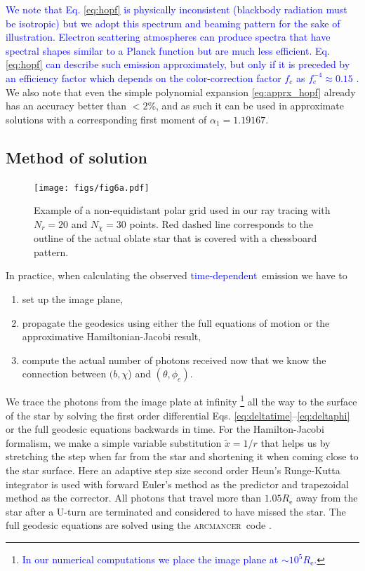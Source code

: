 \documentclass{aa}
\newcommand{\refe}[1]{\textcolor{blue}{{#1}}}
\begin{document}
\refe{We note that Eq. \eqref{eq:hopf} is physically inconsistent (blackbody radiation must be isotropic) but we adopt this spectrum and beaming pattern for the sake of illustration. 
Electron scattering atmospheres can produce spectra that have spectral shapes similar to a Planck function but are much less efficient. 
Eq. \eqref{eq:hopf} can describe such emission approximately, but only if it is preceded by an efficiency factor which depends on the color-correction factor $f_{\mathrm{c}}$ as $f_{\mathrm{c}}^{-4} \approx 0.15$ \citep[see e.g.][]{SPW11, SPW12}.}
We also note that even the simple polynomial expansion \eqref{eq:apprx_hopf} already has an accuracy better than $<2\%$, and as such it can be used in approximate solutions with a corresponding first moment of $\alpha_1 = 1.19167$.




\subsection{Method of solution}\label{sect:num_methods}


\begin{figure}
\centering
\texttt{[image: figs/fig6a.pdf]}
\caption{\label{fig:grid}
Example of a non-equidistant polar grid used in our ray tracing with $N_r = 20$ and $N_{\chi} = 30$ points.
    Red dashed line corresponds to the outline of the actual oblate star that is covered with a chessboard pattern.
}
\end{figure}

In practice, when calculating the observed \refe{time-dependent} emission we have to 
\begin{enumerate}
    \item set up the image plane, 
    \item propagate the geodesics using either the full equations of motion or the approximative Hamiltonian-Jacobi result, 
    \item compute the actual number of photons received now that we know the connection between $(b,\chi$) and $(\theta, \phi_e)$.
\end{enumerate}

We trace the photons from the image plate at infinity%
\footnote{\refe{In our numerical computations we place the image plane at $\sim 10^5 R_{\mathrm{e}}$.}}
all the way to the surface of the star by solving the first order
differential Eqs. \eqref{eq:deltatime}--\eqref{eq:deltaphi} or the full geodesic equations backwards in time.  
For the Hamilton-Jacobi formalism, we make a simple variable substitution $\tilde{x} = 1/r$
 that helps us by stretching the step when
far from the star and shortening it when coming close to the star
surface.  Here an adaptive step size second order Heun's Runge-Kutta
integrator is used with forward Euler's method as
the predictor and trapezoidal method as the corrector.  
All photons that travel more than $1.05 R_{\mathrm{e}}$ away from the star after a U-turn are
terminated and considered to have missed the star.
The full geodesic equations are solved using the \textsc{arcmancer} code \citep[see][and the related equations therein]{PRJ16}.
\end{document}
